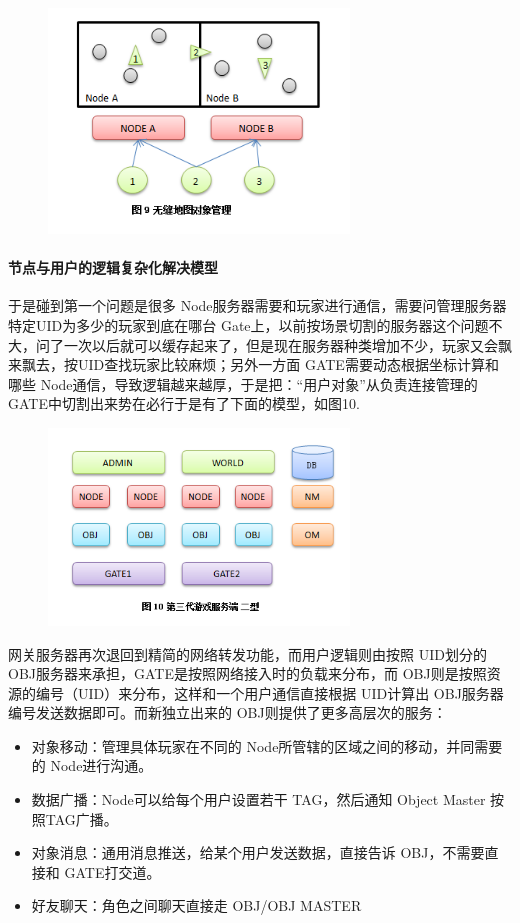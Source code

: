 \documentclass[UTF8,a4paper,8pt]{ctexart}
\begin{document}
			  \begin{figure}[h] 	
			 	 \centering
				 \includegraphics[width=8cm,clip]{gameServer9.png} 	
				 \label{fig:gameServer9}
			   \end{figure} 
			   
			\paragraph{节点与用户的逻辑复杂化解决模型}于是碰到第一个问题是很多 Node服务器需要和玩家进行通信，需要问管理服务器特定UID为多少的玩家到底在哪台 Gate上，以前按场景切割的服务器这个问题不大，问了一次以后就可以缓存起来了，但是现在服务器种类增加不少，玩家又会飘来飘去，按UID查找玩家比较麻烦；另外一方面 GATE需要动态根据坐标计算和哪些 Node通信，导致逻辑越来越厚，于是把：“用户对象”从负责连接管理的 GATE中切割出来势在必行于是有了下面的模型，如图10.
			
				\begin{figure}[h] 	
					\centering
					\includegraphics[width=8cm,clip]{gameServer10.png} 	
					\label{fig:gameServer10}
				\end{figure} 
			网关服务器再次退回到精简的网络转发功能，而用户逻辑则由按照 UID划分的 OBJ服务器来承担，GATE是按照网络接入时的负载来分布，而 OBJ则是按照资源的编号（UID）来分布，这样和一个用户通信直接根据 UID计算出 OBJ服务器编号发送数据即可。而新独立出来的 OBJ则提供了更多高层次的服务：
				\begin{itemize}
					\item  对象移动：管理具体玩家在不同的 Node所管辖的区域之间的移动，并同需要的 Node进行沟通。
					\item  数据广播：Node可以给每个用户设置若干 TAG，然后通知 Object Master 按照TAG广播。
					\item  对象消息：通用消息推送，给某个用户发送数据，直接告诉 OBJ，不需要直接和 GATE打交道。
					\item  好友聊天：角色之间聊天直接走 OBJ/OBJ MASTER
				\end{itemize}
				
\end{document}

